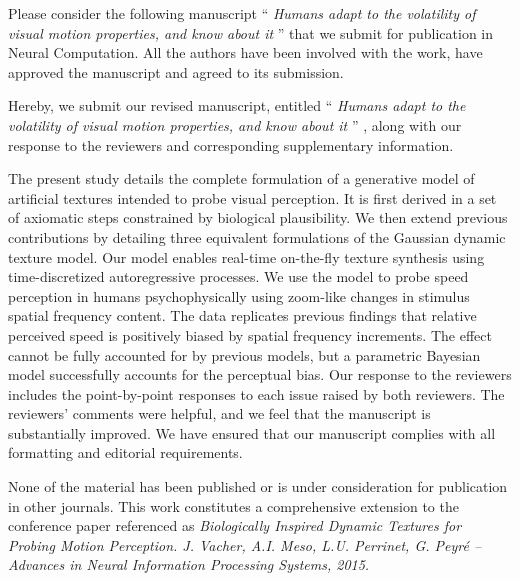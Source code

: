 \documentclass[stdletter,8pt,dateno]{newlfm}%
\newcommand{\Title}{
Humans adapt to the volatility of visual motion properties, and know about it
}
\newcommand{\Journal}{Neural Computation}%
\begin{document}

Please consider the following manuscript ``{\it \Title }'' that we submit for publication in \Journal . All the authors have been involved with the work, have approved the manuscript and agreed to its submission.

Hereby, we submit our revised manuscript, entitled ``{\it \Title }'' ,  along  with  our  response  to  the  reviewers  and  corresponding  supplementary  information.  


The present study details the complete formulation of a generative
model of artificial textures intended to probe visual perception. It is first derived in a set of
axiomatic steps constrained by biological plausibility. We then extend previous contributions
by detailing three equivalent formulations of the Gaussian dynamic texture
model. Our model enables real-time on-the-fly texture synthesis using time-discretized autoregressive
processes. We use the model to probe speed perception in humans psychophysically using zoom-like changes
in stimulus spatial frequency content. The data replicates previous findings that relative perceived speed is positively biased by spatial
frequency increments. The effect cannot be fully accounted for by previous models,
but a parametric Bayesian model successfully accounts for the perceptual bias.
%
Our  response  to  the  reviewers  includes  the  point-by-point  responses  to  each  issue  raised  by  
both reviewers. The reviewers’ comments were helpful, and we feel that the manuscript is substantially improved.  
We have ensured that our manuscript complies with all formatting and editorial requirements.  


None of the material has been published or is under consideration for
publication in other journals. This work constitutes a comprehensive extension to the conference paper referenced as \textit{Biologically Inspired Dynamic Textures for Probing Motion Perception.
J. Vacher, A.I. Meso, L.U. Perrinet, G. Peyr\'e -- Advances in Neural Information Processing Systems, 2015.}
\end{document}
